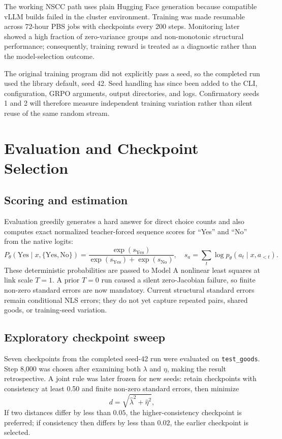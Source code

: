 \documentclass[11pt,letterpaper]{article}
\begin{document}
The working NSCC path uses plain Hugging Face generation because compatible
vLLM builds failed in the cluster environment. Training was made resumable
across 72-hour PBS jobs with checkpoints every 200 steps. Monitoring later
showed a high fraction of zero-variance groups and non-monotonic structural
performance; consequently, training reward is treated as a diagnostic rather
than the model-selection outcome.

The original training program did not explicitly pass a seed, so the completed
run used the library default, seed 42. Seed handling has since been added to the
CLI, configuration, GRPO arguments, output directories, and logs. Confirmatory
seeds 1 and 2 will therefore measure independent training variation rather
than silent reuse of the same random stream.

\section{Evaluation and Checkpoint Selection}

\subsection{Scoring and estimation}

Evaluation greedily generates a hard answer for direct choice counts and also
computes exact normalized teacher-forced sequence scores for ``Yes'' and
``No'' from the native logits:
\begin{equation}
P_\theta(\text{Yes}\mid x,\{\text{Yes},\text{No}\})=
\frac{\exp(s_{\text{Yes}})}
{\exp(s_{\text{Yes}})+\exp(s_{\text{No}})},
\quad
s_a=\sum_t\log p_\theta(a_t\mid x,a_{<t}).
\end{equation}
These deterministic probabilities are passed to Model A nonlinear least
squares at link scale $T=1$. A prior $T=0$ run caused a silent zero-Jacobian
failure, so finite non-zero standard errors are now mandatory. Current
structural standard errors remain conditional NLS errors; they do not yet
capture repeated pairs, shared goods, or training-seed variation.

\subsection{Exploratory checkpoint sweep}

Seven checkpoints from the completed seed-42 run were evaluated on
\texttt{test\_goods}. Step 8,000 was chosen after examining both $\lambda$ and
$\eta$, making the result retrospective. A joint rule was later frozen for new
seeds: retain checkpoints with consistency at least 0.50 and finite non-zero
standard errors, then minimize
\begin{equation}
d=\sqrt{\widehat\lambda^2+\widehat\eta^2},
\end{equation}
If two distances differ by less than $0.05$, the higher-consistency checkpoint
is preferred; if consistency then differs by less than $0.02$, the earlier
checkpoint is selected.
\end{document}

